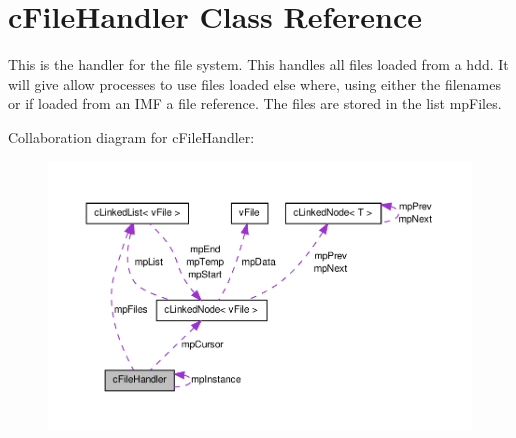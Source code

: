 \hypertarget{classc_file_handler}{
\section{cFileHandler Class Reference}
\label{classc_file_handler}
}


This is the handler for the file system. This handles all files loaded from a hdd. It will give allow processes to use files loaded else where, using either the filenames or if loaded from an IMF a file reference. The files are stored in the list mpFiles.  




Collaboration diagram for cFileHandler:\nopagebreak
\begin{figure}[H]
\begin{center}
\leavevmode
\includegraphics[width=400pt]{classc_file_handler__coll__graph}
\end{center}
\end{figure}

